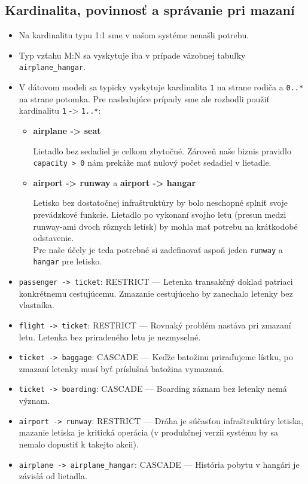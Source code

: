 \documentclass[11pt, a4paper]{article}
\begin{document}
\subsection{Kardinalita, povinnosť a správanie pri mazaní}

\begin{itemize}
    
    \item Na kardinalitu typu 1:1 sme v našom systéme nenašli potrebu.
    \item Typ vzťahu M:N sa vyskytuje iba v prípade väzobnej tabuľky \texttt{airplane\_hangar}.
    \item V dátovom modeli sa typicky vyskytuje kardinalita \texttt{1} na strane rodiča a \texttt{0..*} na strane potomka.
    Pre nasledujúce prípady sme ale rozhodli použiť kardinalitu \texttt{1} -> \texttt{1..*}:

    \begin{itemize}
        \item \textbf{airplane -> seat}

        Lietadlo bez sedadiel je celkom zbytočné. Zároveň naše biznis pravidlo \texttt{capacity > 0} nám prekáže mať nulový počet sedadiel v lietadle.

        \item \textbf{airport -> runway} a \textbf{airport -> hangar}

        Letisko bez dostatočnej infraštruktúry by bolo neschopné splniť svoje prevádzkové funkcie.
        Lietadlo po vykonaní svojho letu (presun medzi runway-ami dvoch rôznych letísk) by mohla mať potrebu na krátkodobé odstavenie. \\
        Pre naše účely je teda potrebné si zadefinovať aspoň jeden \texttt{runway} a \texttt{hangar} pre letisko.
    \end{itemize}

    \item \texttt{passenger -> ticket}: RESTRICT --- Letenka transakčný doklad patriaci konkrétnemu cestujúcemu. Zmazanie cestujúceho by zanechalo letenky bez vlastníka.
    \item \texttt{flight -> ticket}: RESTRICT --- Rovnaký problém nastáva pri zmazaní letu. Letenka bez priradeného letu je nezmyselné.
    \item \texttt{ticket -> baggage}: CASCADE --- Keďže batožinu priraďujeme lístku, po zmazaní letenky musí byť príslušná batožina vymazaná.
    \item \texttt{ticket -> boarding}: CASCADE --- Boarding záznam bez letenky nemá význam.
    \item \texttt{airport -> runway}: RESTRICT --- Dráha je súčasťou infraštruktúry letiska, 
    mazanie letiska je kritická operácia (v produkčnej verzii systému by sa nemalo dopustiť k takejto akcii).
    \item \texttt{airplane -> airplane\_hangar}: CASCADE --- História pobytu v hangári je závislá od lietadla.
\end{itemize}
\end{document}
